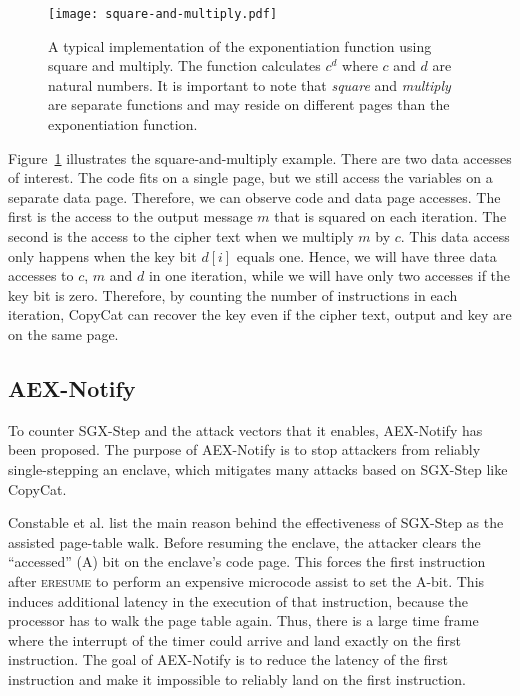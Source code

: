 \documentclass{llncs}
\begin{document}
\begin{figure}[t!]
  \centering
  \texttt{[image: square-and-multiply.pdf]}
  \caption{A typical implementation of the exponentiation function using square and multiply.
    The function calculates $c^d$ where $c$ and $d$ are natural numbers.
    It is important to note that \emph{square} and \emph{multiply} are separate functions
    and may reside on different pages than the exponentiation function.}
  \label{fig:square-and-multiply}
\end{figure}

Figure~\ref{fig:square-and-multiply} illustrates the square-and-multiply example.
There are two data accesses of interest. The code fits on a single page, but we still access the variables on a separate data page. Therefore, we can observe code and data page accesses.
The first is the access to the output message $m$ that is squared on each iteration.
The second is the access to the cipher text when we multiply $m$ by $c$.
This data access only happens when the key bit $d[i]$ equals one.
Hence, we will have three data accesses to $c$, $m$ and $d$ in one iteration,
while we will have only two accesses if the key bit is zero.
Therefore, by counting the number of instructions in each iteration,
CopyCat can recover the key even if the cipher text, output and key are on the same page.


\subsection{AEX-Notify}
\label{sec:aex-notify}

To counter SGX-Step and the attack vectors that it enables, AEX-Notify has been proposed.
The purpose of AEX-Notify is to stop attackers from reliably single-stepping an enclave,
which mitigates many attacks based on SGX-Step like CopyCat.

Constable et al. \cite{ConstableBCXXAK23} list the main reason
behind the effectiveness of SGX-Step as the assisted page-table walk.
Before resuming the enclave, the attacker clears
the ``accessed'' (A) bit on the enclave's code page.
This forces the first instruction after \textsc{eresume}
to perform an expensive microcode assist to set the A-bit.
This induces additional latency in the execution of that instruction, because
the processor has to walk the page table again.
Thus, there is a large time frame where the interrupt of the timer could
arrive and land exactly on the first instruction.
The goal of AEX-Notify is to reduce the latency of the first instruction
and make it impossible to reliably land on the first instruction.
\end{document}
